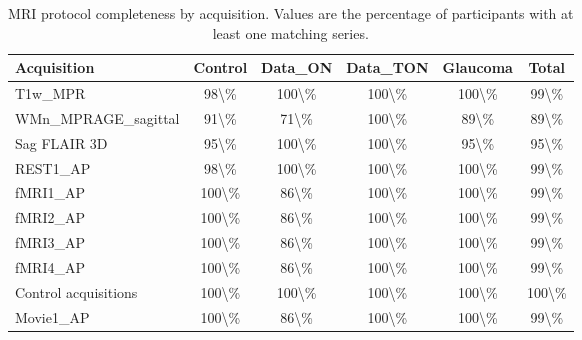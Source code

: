 \documentclass[11pt]{article}
\begin{document}
\pagestyle{empty}
\setlength{\tabcolsep}{3.5pt}
\renewcommand{\arraystretch}{1.2}

\begin{table}[htbp]
\centering
\caption{MRI protocol completeness by acquisition. Values are the percentage of participants with at least one matching series.}
\label{tab:protocol_completeness_by_acquisition}
\small
\begin{tabularx}{\textwidth}{@{}YCCCCC@{}}
\toprule
\textcolor{headergray}{\textbf{Acquisition}} & \textcolor{headergray}{\textbf{Control}} & \textcolor{headergray}{\textbf{Data\_ON}} & \textcolor{headergray}{\textbf{Data\_TON}} & \textcolor{headergray}{\textbf{Glaucoma}} & \textcolor{headergray}{\textbf{Total}} \\
\midrule
T1w\_MPR & 98\textbackslash{}\% & 100\textbackslash{}\% & 100\textbackslash{}\% & 100\textbackslash{}\% & 99\textbackslash{}\% \\
 WMn\_MPRAGE\_sagittal & 91\textbackslash{}\% & 71\textbackslash{}\% & 100\textbackslash{}\% & 89\textbackslash{}\% & 89\textbackslash{}\% \\
Sag FLAIR 3D & 95\textbackslash{}\% & 100\textbackslash{}\% & 100\textbackslash{}\% & 95\textbackslash{}\% & 95\textbackslash{}\% \\
 REST1\_AP & 98\textbackslash{}\% & 100\textbackslash{}\% & 100\textbackslash{}\% & 100\textbackslash{}\% & 99\textbackslash{}\% \\
fMRI1\_AP & 100\textbackslash{}\% & 86\textbackslash{}\% & 100\textbackslash{}\% & 100\textbackslash{}\% & 99\textbackslash{}\% \\
 fMRI2\_AP & 100\textbackslash{}\% & 86\textbackslash{}\% & 100\textbackslash{}\% & 100\textbackslash{}\% & 99\textbackslash{}\% \\
fMRI3\_AP & 100\textbackslash{}\% & 86\textbackslash{}\% & 100\textbackslash{}\% & 100\textbackslash{}\% & 99\textbackslash{}\% \\
 fMRI4\_AP & 100\textbackslash{}\% & 86\textbackslash{}\% & 100\textbackslash{}\% & 100\textbackslash{}\% & 99\textbackslash{}\% \\
Control acquisitions & 100\textbackslash{}\% & 100\textbackslash{}\% & 100\textbackslash{}\% & 100\textbackslash{}\% & 100\textbackslash{}\% \\
 Movie1\_AP & 100\textbackslash{}\% & 86\textbackslash{}\% & 100\textbackslash{}\% & 100\textbackslash{}\% & 99\textbackslash{}\% \\

\end{tabularx}
\end{table}
\end{document}
